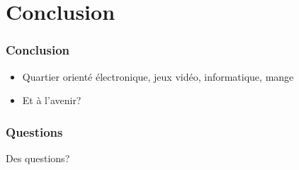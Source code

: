 \documentclass{beamer}
\begin{document}
\section{Conclusion}

\begin{frame}
  \frametitle{Conclusion}
  \begin{itemize}
    \item Quartier orienté électronique, jeux vidéo, informatique, mange
    \item Et à l'avenir?
  \end{itemize}
\end{frame}

\begin{frame}
  \frametitle{Questions}
  \Large Des questions?
\end{frame}
\end{document}
